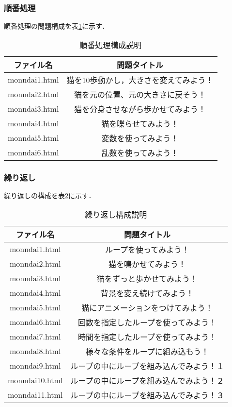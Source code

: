 \subsubsection{順番処理}
順番処理の問題構成を表\ref{tab:zyunnbannhyou}に示す．
\begin{table}[htb]
\begin{center}
    \caption{順番処理構成説明}
  \begin{tabular}{|c|c|} \hline
     ファイル名  & 問題タイトル  \\ \hline
     monndai1.html& 猫を10歩動かし，大きさを変えてみよう！ \\ \hline
     monndai2.html& 猫を元の位置、元の大きさに戻そう！ \\ \hline
     monndai3.html& 猫を分身させながら歩かせてみよう！ \\ \hline
     monndai4.html& 猫を喋らせてみよう！ \\ \hline
     monndai5.html& 変数を使ってみよう！ \\ \hline
     monndai6.html& 乱数を使ってみよう！ \\ \hline
  \end{tabular}
  \label{tab:zyunnbannhyou}
  \end{center}
\end{table}

\subsubsection{繰り返し}
繰り返しの構成を表\ref{tab:kurikaesihyou}に示す．

\begin{table}[htb]
\begin{center}
    \caption{繰り返し構成説明}
  \begin{tabular}{|c|c|} \hline
     ファイル名  & 問題タイトル  \\ \hline
     monndai1.html& ループを使ってみよう！ \\ \hline
     monndai2.html& 猫を鳴かせてみよう！ \\ \hline
     monndai3.html& 猫をずっと歩かせてみよう！ \\ \hline
     monndai4.html& 背景を変え続けてみよう！ \\ \hline
     monndai5.html& 猫にアニメーションをつけてみよう！ \\ \hline
     monndai6.html& 回数を指定したループを使ってみよう！ \\ \hline
     monndai7.html& 時間を指定したループを使ってみよう！ \\ \hline
     monndai8.html& 様々な条件をループに組み込もう！ \\ \hline
     monndai9.html& ループの中にループを組み込んでみよう！１ \\ \hline
     monndai10.html& ループの中にループを組み込んでみよう！２ \\ \hline
     monndai11.html& ループの中にループを組み込んでみよう！３ \\ \hline
  \end{tabular}
  \label{tab:kurikaesihyou}
  \end{center}
\end{table}
\newpage

